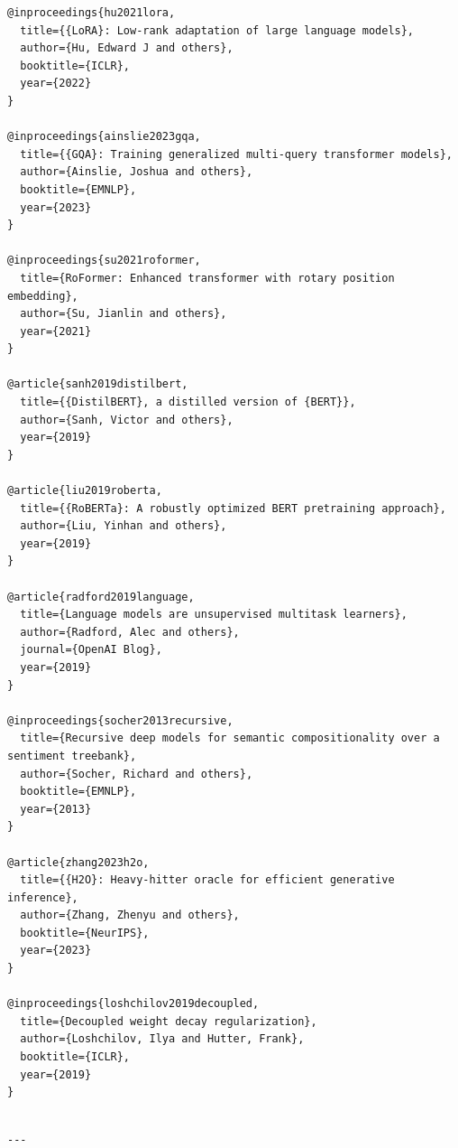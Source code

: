 \begin{lstlisting}
@inproceedings{hu2021lora,
  title={{LoRA}: Low-rank adaptation of large language models},
  author={Hu, Edward J and others},
  booktitle={ICLR},
  year={2022}
}

@inproceedings{ainslie2023gqa,
  title={{GQA}: Training generalized multi-query transformer models},
  author={Ainslie, Joshua and others},
  booktitle={EMNLP},
  year={2023}
}

@inproceedings{su2021roformer,
  title={RoFormer: Enhanced transformer with rotary position embedding},
  author={Su, Jianlin and others},
  year={2021}
}

@article{sanh2019distilbert,
  title={{DistilBERT}, a distilled version of {BERT}},
  author={Sanh, Victor and others},
  year={2019}
}

@article{liu2019roberta,
  title={{RoBERTa}: A robustly optimized BERT pretraining approach},
  author={Liu, Yinhan and others},
  year={2019}
}

@article{radford2019language,
  title={Language models are unsupervised multitask learners},
  author={Radford, Alec and others},
  journal={OpenAI Blog},
  year={2019}
}

@inproceedings{socher2013recursive,
  title={Recursive deep models for semantic compositionality over a sentiment treebank},
  author={Socher, Richard and others},
  booktitle={EMNLP},
  year={2013}
}

@article{zhang2023h2o,
  title={{H2O}: Heavy-hitter oracle for efficient generative inference},
  author={Zhang, Zhenyu and others},
  booktitle={NeurIPS},
  year={2023}
}

@inproceedings{loshchilov2019decoupled,
  title={Decoupled weight decay regularization},
  author={Loshchilov, Ilya and Hutter, Frank},
  booktitle={ICLR},
  year={2019}
}
\end{lstlisting}
\begin{lstlisting}

---
\end{lstlisting}
